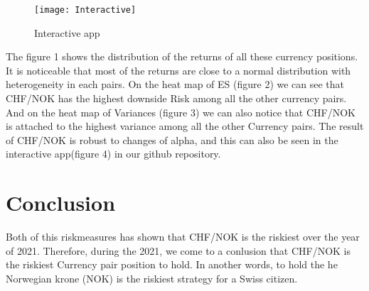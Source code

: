 \documentclass{article}
\begin{document}
\begin{figure}[H]
\centering
\texttt{[image: Interactive]}
\caption{Interactive app}\label{visina8}
\end{figure}


The figure 1 shows the distribution of the returns of all these currency positions. It is noticeable that most of the returns are close to a normal distribution with heterogeneity in each pairs. On the heat map of ES (figure 2) we can see that CHF/NOK has the highest downside Risk among all the other currency pairs. And on the heat map of Variances (figure 3) we can also notice that CHF/NOK is attached to the highest variance among all the other Currency pairs. The result of CHF/NOK is robust to changes of alpha, and this can also be seen in the interactive app(figure 4) in our github repository.

\section{Conclusion}
Both of this riskmeasures has shown that CHF/NOK is the riskiest over the year of 2021. Therefore, during the 2021, we come to a conlusion that CHF/NOK is the riskiest Currency pair position to hold. In another words, to hold the he Norwegian krone (NOK) is the riskiest strategy for a Swiss citizen.

\cite{CieslakEtAlStockReturns}
\printbibliography
\end{document}
